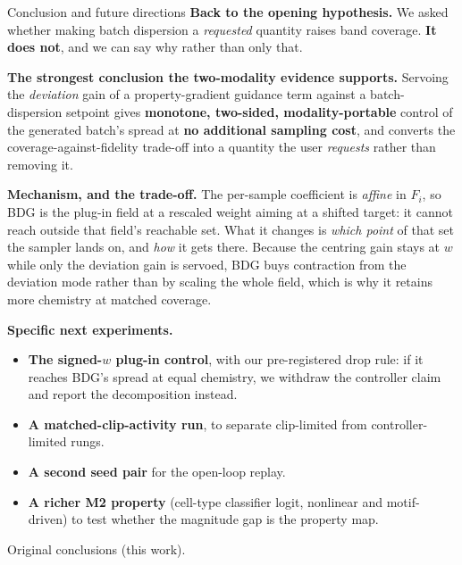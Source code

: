 \documentclass[aspectratio=169,10pt]{beamer}
\newcommand{\theslidelabel}{}
\newcommand{\lbl}[1]{\renewcommand{\theslidelabel}{#1}}
\newcommand{\srcs}[1]{\vfill{\raggedleft\color{grayt}\fontsize{4.9}{5.6}\selectfont #1\par}}
\begin{document}
\lbl{3e}
\begin{frame}[shrink=15]{Conclusion and future directions}
  \textbf{Back to the opening hypothesis.} We asked whether making batch dispersion
  a \emph{requested} quantity raises band coverage. \textbf{It does not}, and we can
  say why rather than only that.

  \medskip
  \textbf{The strongest conclusion the two-modality evidence supports.} Servoing the
  \emph{deviation} gain of a property-gradient guidance term against a
  batch-dispersion setpoint gives \textbf{monotone, two-sided, modality-portable}
  control of the generated batch's spread at \textbf{no additional sampling cost},
  and converts the coverage-against-fidelity trade-off into a quantity the user
  \emph{requests} rather than removing it.

  \medskip
  \textbf{Mechanism, and the trade-off.} The per-sample coefficient is
  \emph{affine} in $F_i$, so BDG is the plug-in field at a rescaled weight aiming at
  a shifted target: it cannot reach outside that field's reachable set. What it
  changes is \emph{which point} of that set the sampler lands on, and \emph{how} it
  gets there. Because the centring gain stays at $w$ while only the deviation gain is
  servoed, BDG buys contraction from the deviation mode rather than by scaling the
  whole field, which is why it retains more chemistry at matched coverage.

  \medskip
  \textbf{Specific next experiments.}
  \begin{itemize}\setlength\itemsep{0.05em}
    \item \textbf{The signed-$w$ plug-in control}, with our pre-registered drop rule:
      if it reaches BDG's spread at equal chemistry, we withdraw the controller claim
      and report the decomposition instead.
    \item \textbf{A matched-clip-activity run}, to separate clip-limited from
      controller-limited rungs.
    \item \textbf{A second seed pair} for the open-loop replay.
    \item \textbf{A richer M2 property} (cell-type classifier logit, nonlinear and
      motif-driven) to test whether the magnitude gap is the property map.
  \end{itemize}

  \srcs{Original conclusions (this work).}
\end{frame}
\end{document}
